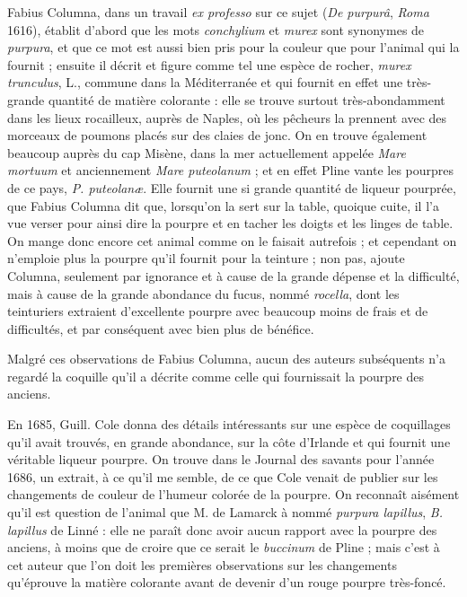 \documentclass[a4paper, 11pt, oneside, polutonikogreek, french]{article}
\begin{document}
Fabius Columna, dans un travail \emph{ex professo} sur ce sujet (\emph{De purpurâ}, \emph{Roma} 1616), établit d'abord que les mots \emph{conchylium} et \emph{murex} sont synonymes de \emph{purpura}, et que ce mot est aussi bien pris pour la couleur que pour l'animal qui la fournit ; ensuite il décrit et figure comme tel une espèce de rocher, \emph{murex trunculus}, L., commune dans la Méditerranée et qui fournit en effet une très-grande quantité de matière colorante : elle se trouve surtout très-abondamment dans les lieux rocailleux, auprès de Naples, où les pêcheurs la prennent avec des morceaux de poumons placés sur des claies de jonc. On en trouve également beaucoup auprès du cap Misène, dans la mer actuellement appelée \emph{Mare mortuum} et anciennement \emph{Mare puteolanum} ; et en effet Pline vante les pourpres de ce pays, \emph{P. puteolanæ}. Elle fournit une si grande quantité de liqueur pourprée, que Fabius Columna dit que, lorsqu'on la sert sur la table, quoique cuite, il l'a vue verser pour ainsi dire la pourpre et en tacher les doigts et les linges de table. On mange donc encore cet animal comme on le faisait autrefois ; et cependant on n'emploie plus la pourpre qu'il fournit pour la teinture ; non pas, ajoute Columna, seulement par ignorance et à cause de la grande dépense et la difficulté, mais à cause de la grande abondance du fucus, nommé \emph{rocella}, dont les teinturiers extraient d'excellente pourpre avec beaucoup moins de frais et de difficultés, et par conséquent avec bien plus de bénéfice.

Malgré ces observations de Fabius Columna, aucun des auteurs subséquents n'a regardé la coquille qu'il a décrite comme celle qui fournissait la pourpre des anciens.

En 1685, Guill. Cole donna des détails intéressants sur une espèce de coquillages qu'il avait trouvés, en grande abondance, sur la côte d'Irlande et qui fournit une véritable liqueur pourpre. On trouve dans le Journal des savants pour l'année 1686, un extrait, à ce qu'il me semble, de ce que Cole venait de publier sur les changements de couleur de l'humeur colorée de la pourpre. On reconnaît aisément qu'il est question de l'animal que M. de Lamarck à nommé \emph{purpura lapillus}, \emph{B. lapillus} de Linné : elle ne paraît donc avoir aucun rapport avec la pourpre des anciens, à moins que de croire que ce serait le \emph{buccinum} de Pline ; mais c'est à cet auteur que l'on doit les premières observations sur les changements qu'éprouve la matière colorante avant de devenir d'un rouge pourpre très-foncé.
\end{document}

